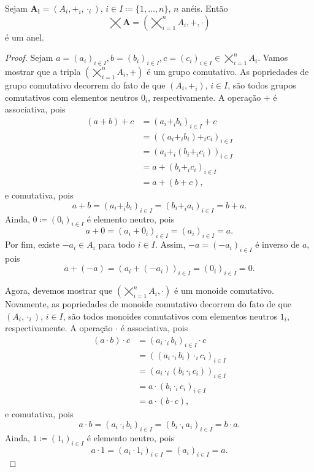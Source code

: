 \begin{prop}
	Sejam $\bm{A_i}=(A_i,+_i,\cdot_i)$, $i \in I \coloneqq \{1,\ldots,n\}$, $n$ anéis. Então
	\begin{equation*}
	\bm {\bigtimes A}=\left( \bigtimes_{i=1}^n A_i,+,\cdot \right)
	\end{equation*}
é um anel.
\end{prop}
\begin{proof}
	Sejam $a=(a_i)_{i \in I}, b=(b_i)_{i \in I}, c=(c_i)_{i \in I} \in \bigtimes_{i=1}^n A_i$. Vamos mostrar que a tripla $\left( \bigtimes_{i=1}^n A_i,+ \right)$ é um grupo comutativo. As popriedades de grupo comutativo decorrem do fato de que $(A_i,+_i)$, $i \in I$, são todos grupos comutativos com elementos neutros $0_i$, respectivamente. A operação $+$ é associativa, pois
	\begin{align*}
	(a + b) + c &= (a_i +_i b_i)_{i \in I} + c \\
		&= ((a_i +_i b_i) +_i c_i)_{i \in I} \\
		&= (a_i +_i (b_i +_i c_i))_{i \in I} \\
		&= a + (b_i +_i c_i)_{i \in I} \\
		&= a + (b + c),
	\end{align*}
e comutativa, pois
	\begin{equation*}
	a + b = (a_i +_i b_i)_{i \in I} = (b_i +_i a_i)_{i \in I} = b + a.
	\end{equation*}
Ainda, $0 \coloneqq (0_i)_{i \in I}$ é elemento neutro, pois
	\begin{equation*}
	a + 0 = (a_i + 0_i)_{i \in I} = (a_i)_{i \in I} = a.
	\end{equation*}
Por fim, existe $-a_i \in A_i$ para todo ${i \in I}$. Assim, $-a=(-a_i)_{i \in I}$ é inverso de $a$, pois
	\begin{equation*}
	a + (-a) = (a_i + (-a_i))_{i \in I} = (0_i)_{i \in I} = 0.
	\end{equation*}

	Agora, devemos mostrar que $\left( \bigtimes_{i=1}^n A_i,\cdot \right)$ é um monoide comutativo. Novamente, as popriedades de monoide comutativo decorrem do fato de que $(A_i,\cdot_i)$, $i \in I$, são todos monoides comutativos com elementos neutros $1_i$, respectivamente. A operação $\cdot$ é associativa, pois
	\begin{align*}
	(a \cdot b) \cdot c &= (a_i \cdot_i b_i)_{i \in I} \cdot c \\
		&= ((a_i \cdot_i b_i) \cdot_i c_i)_{i \in I} \\
		&= (a_i \cdot_i (b_i \cdot_i c_i))_{i \in I} \\
		&= a \cdot (b_i \cdot_i c_i)_{i \in I} \\
		&= a \cdot (b \cdot c),
	\end{align*}
e comutativa, pois
	\begin{equation*}
	a \cdot b = (a_i \cdot_i b_i)_{i \in I} = (b_i \cdot_i a_i)_{i \in I} = b \cdot a.
	\end{equation*}
Ainda, $1 \coloneqq (1_i)_{i \in I}$ é elemento neutro, pois
	\begin{equation*}
	a \cdot 1 = (a_i \cdot 1_i)_{i \in I} = (a_i)_{i \in I} = a.
	\end{equation*}


\end{proof}
